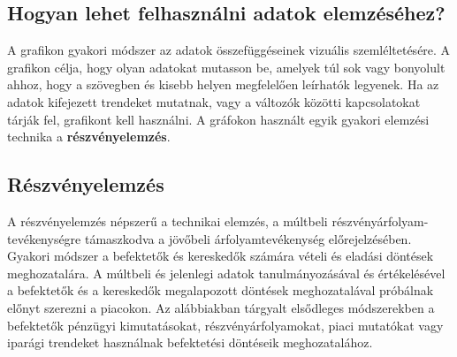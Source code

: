 \subsection{Hogyan lehet felhasználni adatok elemzéséhez?}

A grafikon gyakori módszer az adatok összefüggéseinek vizuális szemléltetésére. A grafikon célja, hogy olyan adatokat mutasson be, amelyek túl sok vagy bonyolult ahhoz, hogy a szövegben és kisebb helyen megfelelően leírhatók legyenek. Ha az adatok kifejezett trendeket mutatnak, vagy a változók közötti kapcsolatokat tárják fel, grafikont kell használni. 
A gráfokon használt egyik gyakori elemzési technika a \textbf{részvényelemzés}.

\subsection{Részvényelemzés}

A részvényelemzés népszerű a technikai elemzés, a múltbeli részvényárfolyam-
tevékenységre támaszkodva a jövőbeli árfolyamtevékenység előrejelzésében. Gyakori módszer a befektetők és kereskedők számára vételi és eladási döntések meghozatalára. A múltbeli és jelenlegi adatok tanulmányozásával és értékelésével a befektetők és a kereskedők megalapozott döntések meghozatalával próbálnak előnyt szerezni a piacokon. Az alábbiakban tárgyalt elsődleges módszerekben a befektetők pénzügyi kimutatásokat, részvényárfolyamokat, piaci mutatókat vagy iparági trendeket használnak befektetési döntéseik meghozatalához. \cite{investo}
